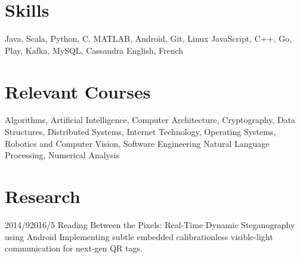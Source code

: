 \documentclass[11pt,letterpaper]{moderncv}
\begin{document}

\section{Skills}
       {Java, Scala, Python, C, MATLAB, Android, Git, Linux}
       {JavaScript, C++, Go, Play, Kafka, MySQL, Cassandra}
       {English, French}

\section{Relevant Courses}
       {Algorithms, Artificial Intelligence, Computer Architecture, Cryptography, Data Structures, Distributed Systems, Internet Technology, Operating Systems, Robotics and Computer Vision, Software Engineering}
       {Natural Language Processing, Numerical Analysis}

\section{Research}
    \tlcventry
        {2014/9}{2016/5}
		{Reading Between the Pixels: Real-Time Dynamic Steganography using Android}
        {}
        {}
        {}
        {Implementing subtle embedded calibrationless visible-light communication for next-gen QR tags.}

%
\end{document}

